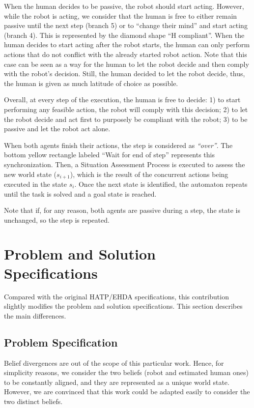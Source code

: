 When the human decides to be passive, the robot should start acting. 
However, while the robot is acting, we consider that the human is free to either remain passive until the next step (branch 5) or to ``change their mind'' and start acting (branch 4).
This is represented by the diamond shape ``H compliant''. When the human decides to start acting after the robot starts, the human can only perform actions that do not conflict with the already started robot action. Note that this case can be seen as a way for the human to let the robot decide and then comply with the robot's decision. Still, the human decided to let the robot decide, thus, the human is given as much latitude of choice as possible.

Overall, at every step of the execution, the human is free to decide: 1) to start performing any feasible action, the robot will comply with this decision; 2) to let the robot decide and act first to purposely be compliant with the robot; 3) to be passive and let the robot act alone.

When both agents finish their actions, the step is considered as \textit{``over''}. The bottom yellow rectangle labeled ``Wait for end of step'' represents this synchronization. Then, a Situation Assessment Process is executed to assess the new world state ($s_{i+1}$), which is the result of the concurrent actions being executed in the state $s_i$. Once the next state is identified, the automaton repeats until the task is solved and a goal state is reached.

Note that if, for any reason, both agents are passive during a step, the state is unchanged, so the step is repeated. 



\section{Problem and Solution Specifications}

Compared with the original HATP/EHDA specifications, this contribution slightly modifies the problem and solution specifications. This section describes the main differences.

    \subsection*{Problem Specification}

Belief divergences are out of the scope of this particular work. Hence, for simplicity reasons, we consider the two beliefs (robot and estimated human ones) to be constantly aligned, and they are represented as a unique world state. However, we are convinced that this work could be adapted easily to consider the two distinct beliefs.

